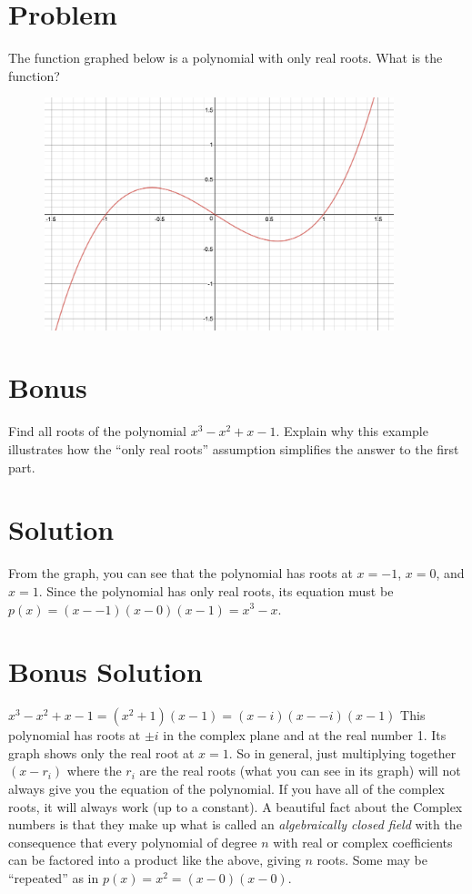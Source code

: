 \documentclass[11pt,a4paper]{report}
\theoremstyle{plain}
\theoremstyle{definition}
\theoremstyle{remark}
\begin{document}
\section*{Problem}
The function graphed below is a polynomial with only real roots. What is the function?
\begin{figure}[h!]
  \includegraphics[width=4in]{poly.png}
  {\caption*{}}
  \label{}
\end{figure}
\section*{Bonus}
Find all roots of the polynomial $x^3-x^2+x-1$.  Explain why this example illustrates how the ``only real roots'' assumption simplifies the answer to the first part.

\newpage
\section*{Solution}
From the graph, you can see that the polynomial has roots at $x=-1$, $x=0$, and $x=1$.  Since the polynomial has only real roots, its equation must be $p(x) = (x - - 1)(x - 0)(x - 1) = x^3 - x$.

\section*{Bonus Solution}
$x^3 - x^2 + x - 1 = (x^2 + 1)(x - 1) = (x - i)(x -- i)(x - 1)$
This polynomial has roots at $\pm i$ in the complex plane and at the real number 1.  Its graph shows only the real root at $x = 1$.  So in general, just multiplying together $(x - r_i)$ where the $r_i$ are the real roots (what you can see in its graph) will not always give you the equation of the polynomial.  If you have all of the complex roots, it will always work (up to a constant). A beautiful fact about the Complex numbers is that they make up what is called an \textit{algebraically closed field} with the consequence that every polynomial of degree $n$ with real or complex coefficients can be factored into a product like the above, giving $n$ roots.  Some may be ``repeated'' as in $p(x) = x^2 = (x - 0)(x - 0)$.
\end{document}
